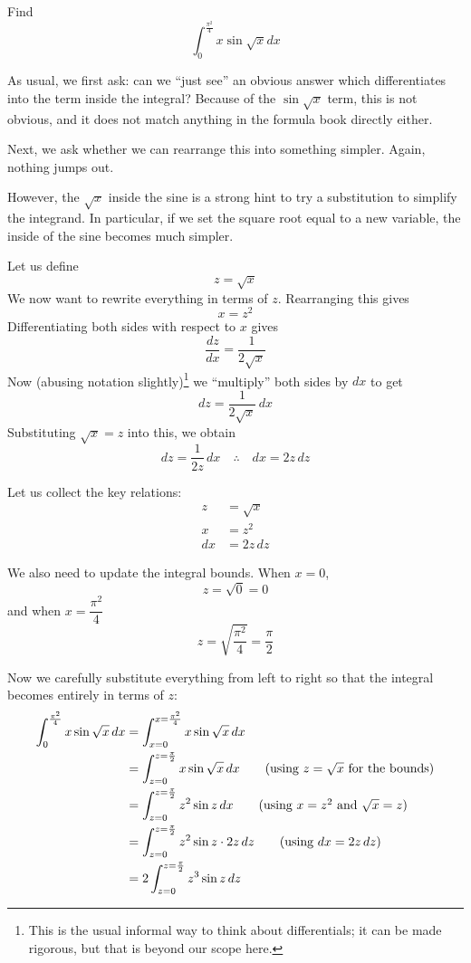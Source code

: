 \begin{example}
    Find
    \[ \int_0^{\frac{\pi^2}{4}} x  \sin \sqrt{x} dx\]
\end{example}
\begin{solution}
    As usual, we first ask: can we ``just see'' an obvious answer which differentiates into the term inside the integral?  
    Because of the $\sin \sqrt{x}$ term, this is not obvious, and it does not match anything in the formula book directly either.

    Next, we ask whether we can rearrange this into something simpler. Again, nothing jumps out.

    However, the $\sqrt{x}$ inside the sine is a strong hint to try a substitution to simplify the integrand.  
    In particular, if we set the square root equal to a new variable, the inside of the sine becomes much simpler.

    Let us define
    \[
        z = \sqrt{x}
    \]
    We now want to rewrite everything in terms of $z$. Rearranging this gives
    \[
        x = z^2
    \]
    Differentiating both sides with respect to $x$ gives
    \[
        \frac{dz}{dx} = \frac{1}{2\sqrt{x}}
    \]
    Now (abusing notation slightly)\footnote{This is the usual informal way to think about differentials; it can be made rigorous, but that is beyond our scope here.} we ``multiply'' both sides by $dx$ to get
    \[
        dz = \frac{1}{2\sqrt{x}} \, dx
    \]
    Substituting $\sqrt{x} = z$ into this, we obtain
    \[
        dz = \frac{1}{2z} \, dx \quad \therefore \quad dx = 2z \, dz
    \]

    Let us collect the key relations:
    \begin{align*}
        z &= \sqrt{x} \\
        x &= z^2 \\
        dx &= 2z \, dz
    \end{align*}

    We also need to update the integral bounds. When $x = 0$,
    \[
        z = \sqrt{0} = 0
    \]
    and when $x = \dfrac{\pi^2}{4}$
    \[
        z = \sqrt{\frac{\pi^2}{4}} = \frac{\pi}{2}
    \]

    Now we carefully substitute everything from left to right so that the integral becomes entirely in terms of $z$:
    \begin{align*}
        \int_0^{\frac{\pi^2}{4}} x \sin \sqrt{x} \, dx
            &= \int_{x=0}^{x=\frac{\pi^2}{4}} x \sin \sqrt{x} \, dx \\
            &= \int_{z=0}^{z=\frac{\pi}{2}} x \sin \sqrt{x} \, dx \tag{using $z = \sqrt{x}$ for the bounds} \\
            &= \int_{z=0}^{z=\frac{\pi}{2}} z^2 \sin z \, dx \tag{using $x = z^2$ and $\sqrt{x} = z$} \\
            &= \int_{z=0}^{z=\frac{\pi}{2}} z^2 \sin z \cdot 2z \, dz \tag{using $dx = 2z \, dz$} \\
            &= 2 \int_{z=0}^{z=\frac{\pi}{2}} z^3 \sin z \, dz
    \end{align*}


\end{solution}
